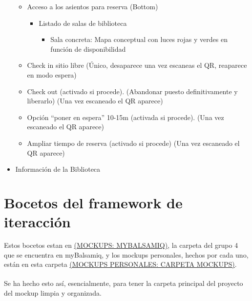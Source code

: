 \documentclass[12pt]{article}
\begin{document}
\begin{itemize}
\begin{itemize}
\begin{itemize}
\begin{itemize}
\end{itemize}

\end{itemize}

\item Acceso a los asientos para reserva (Bottom)

\begin{itemize}
\item Listado de salas de biblioteca
\begin{itemize}
\item Sala concreta: Mapa conceptual con luces rojas y verdes en función de disponibilidad

\end{itemize}
\end{itemize}

\item Check in sitio libre (Único, desaparece una vez escaneas el QR, reaparece en modo espera)

\item Check out (activado si procede). (Abandonar puesto definitivamente y liberarlo) (Una vez escaneado el QR aparece)
\item Opción “poner en espera” 10-15m (activada si procede). (Una vez escaneado el QR aparece)

\item Ampliar tiempo de reserva (activado si procede) (Una vez escaneado el QR aparece)


\end{itemize}

\item Información de la Biblioteca


\end{itemize}





\newpage
\section{Bocetos del framework de iteracción}

Estos bocetos estan en \href{https://ucm-dsi.mybalsamiq.com/projects/1819-b-proyecto-g04/grid}{(MOCKUPS: MYBALSAMIQ)}, la carpeta del grupo 4 que se encuentra en myBalsamiq, y los mockups personales, hechos por cada uno, están en esta carpeta \href{https://drive.google.com/open?id=147zao3EmZsQRw81fojuigk7AfHRFlDBY}{(MOCKUPS PERSONALES: CARPETA MOCKUPS)}.
\\
\\
Se ha hecho esto así, esencialmente, para tener la carpeta principal del proyecto del mockup limpia y organizada.
\end{document}
